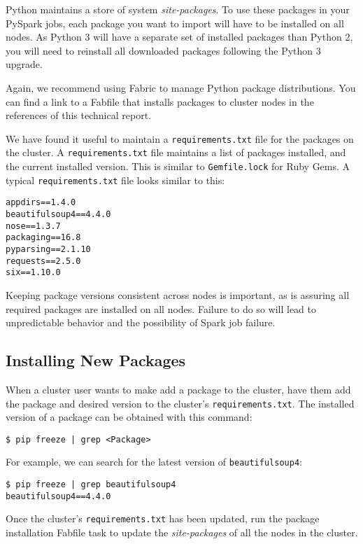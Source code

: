 \documentclass[9pt,twocolumn,twoside]{idsi}
\begin{document}
Python maintains a store of system \emph{site-packages}. To use these packages in your PySpark jobs, each package you want to import will have to be installed on all nodes. As Python 3 will have a separate set of installed packages than Python 2, you will need to reinstall all downloaded packages following the Python 3 upgrade.

Again, we recommend using Fabric to manage Python package distributions. You can find a link to a Fabfile that installs packages to cluster nodes in the references of this technical report.

We have found it useful to maintain a \texttt{requirements.txt} file for the packages on the cluster. A \texttt{requirements.txt} file maintains a list of packages installed, and the current installed version. This is similar to \texttt{Gemfile.lock} for Ruby Gems. A typical \texttt{requirements.txt} file looks similar to this:

\begin{verbatim}
appdirs==1.4.0
beautifulsoup4==4.4.0
nose==1.3.7
packaging==16.8
pyparsing==2.1.10
requests==2.5.0
six==1.10.0
\end{verbatim}

Keeping package versions consistent across nodes is important, as is assuring all required packages are installed on all nodes. Failure to do so will lead to unpredictable behavior and the possibility of Spark job failure.

\subsection{Installing New Packages}

When a cluster user wants to make add a package to the cluster, have them add the package and desired version to the cluster's \texttt{requirements.txt}. The installed version of a package can be obtained with this command:
\begin{verbatim}
$ pip freeze | grep <Package>
\end{verbatim}

For example, we can search for the latest version of \texttt{beautifulsoup4}:
\begin{verbatim}
$ pip freeze | grep beautifulsoup4
beautifulsoup4==4.4.0
\end{verbatim}

Once the cluster's \texttt{requirements.txt} has been updated, run the package installation Fabfile task to update the \emph{site-packages} of all the nodes in the cluster.
\end{document}
